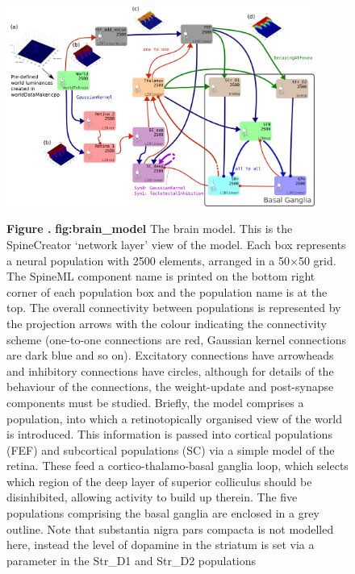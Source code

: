 \documentclass{frontiersSCNS}
\begin{document}
\begin{figure}[htb!]
\begin{center}
\includegraphics[width=0.9\textwidth]{./figures/Brain_Model.png}
\end{center}
\textbf{\label{fig:brain_model} Figure .}
{ \textbf{fig:brain\_model} The brain model. This is the SpineCreator
`network layer' view of the model. Each box represents a neural
population with 2500 elements, arranged in a 50$\times$50 grid. The
SpineML component name is printed on the bottom right corner of each
population box and the population name is at the top. The overall
connectivity between populations is represented by the projection
arrows with the colour indicating the connectivity scheme (one-to-one
connections are red, Gaussian kernel connections are dark blue and so
on). Excitatory connections have arrowheads and inhibitory connections
have circles, although for details of the behaviour of the
connections, the weight-update and post-synapse components must be
studied. Briefly, the model comprises a  population, into
which a retinotopically organised view of the world is
introduced. This information is passed into cortical populations (FEF)
and subcortical populations (SC) via a simple model of the
retina. These feed a cortico-thalamo-basal ganglia loop, which selects
which region of the deep layer of superior colliculus should be
disinhibited, allowing activity to build up therein. The five
populations comprising the basal ganglia are enclosed in a grey
outline. Note that substantia nigra pars compacta is not modelled
here, instead the level of dopamine in the striatum is set via a
parameter in the Str\_D1 and Str\_D2 populations}
\end{figure}
\end{document}
